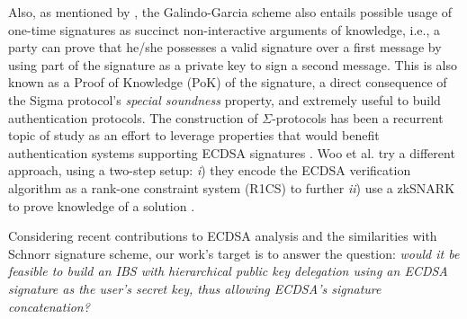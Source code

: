 \documentclass[version=submission, floatrow]{iacrcc}
\begin{document}
Also, as mentioned by \cite{Barreto2023}, the Galindo-Garcia scheme also entails possible usage of one-time signatures as succinct non-interactive arguments of knowledge, i.e., a party can prove that he/she possesses a valid signature over a first message by using part of the signature as a private key to sign a second message.
%
This is also known as a Proof of Knowledge (PoK) of the signature, a direct consequence of the Sigma protocol's \emph{special soundness} property, and extremely useful to build authentication protocols.
%
The construction of $\Sigma$-protocols has been a recurrent topic of study as an effort to leverage properties that would benefit authentication systems supporting ECDSA signatures \cite{C:AgrGanMoh18, Hernandez2022, Celi2024}.
%
Woo et al. \cite{Woo2025} try a different approach, using a two-step setup: \emph{i}) they encode the ECDSA verification algorithm as a rank-one constraint system (R1CS) \cite{Sasson2019} to further \emph{ii}) use a zkSNARK to prove knowledge of a solution \cite{Bitansky2012}.


Considering recent contributions to ECDSA analysis and the similarities with Schnorr signature scheme, our work's target is to answer the question: \emph{would it be feasible to build an IBS with hierarchical public key delegation using an ECDSA signature as the user's secret key, thus allowing ECDSA's signature concatenation?}\\
\end{document}

